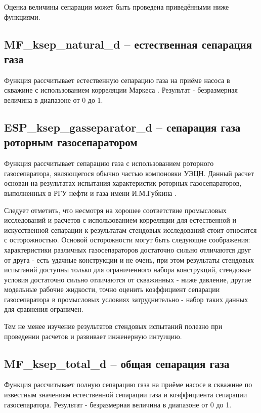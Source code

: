 Оценка величины сепарации может быть проведена приведёнными ниже функциями.

\subsection{MF\_ksep\_natural\_d – естественная сепарация газа}
Функция рассчитывает естественную сепарацию газа на приёме насоса в скважине с использованием корреляции Маркеса \cite{Marquez_2003} . Результат - безразмерная величина в диапазоне от 0 до 1. 


\subsection{ESP\_ksep\_gasseparator\_d – сепарация газа роторным газосепаратором}
Функция рассчитывает сепарацию газа с использованием роторного газосепаратора, являющегося обычно частью компоновки УЭЦН. Данный расчет основан на результатах испытания характеристик роторных газосепараторов, выполненных в РГУ нефти и газа имени И.М.Губкина \cite{SPE_117415_2008}. 

Следует отметить, что несмотря на хорошее соответствие промысловых исследований и расчетов с использованием корреляции для естественной и искусственной сепарации \cite{SPE_117415_2008} к результатам стендовых исследований стоит относится с осторожностью. Основой осторожности могут быть следующие соображения: характеристики различных газосепараторов достаточно сильно отличаются друг от друга - есть удачные конструкции и не очень, при этом результаты стендовых испытаний доступны только для ограниченного набора конструкций, стендовые условия достаточно сильно отличаются от скважинных - ниже давление, другие модельные рабочие жидкости, точно оценить коэффициент сепарации газосепаратора в промысловых условиях затруднительно - набор таких данных для сравнения ограничен. 

Тем не менее изучение результатов стендовых испытаний полезно при проведении расчетов и развивает инженерную интуицию. 



\subsection{MF\_ksep\_total\_d – общая сепарация газа}

Функция рассчитывает полную сепарацию газа на приёме насосе в скважине по известным значениям естественной сепарации газа и коэффициента сепарации газосепаратора. Результат - безразмерная величина в диапазоне от 0 до 1. 

